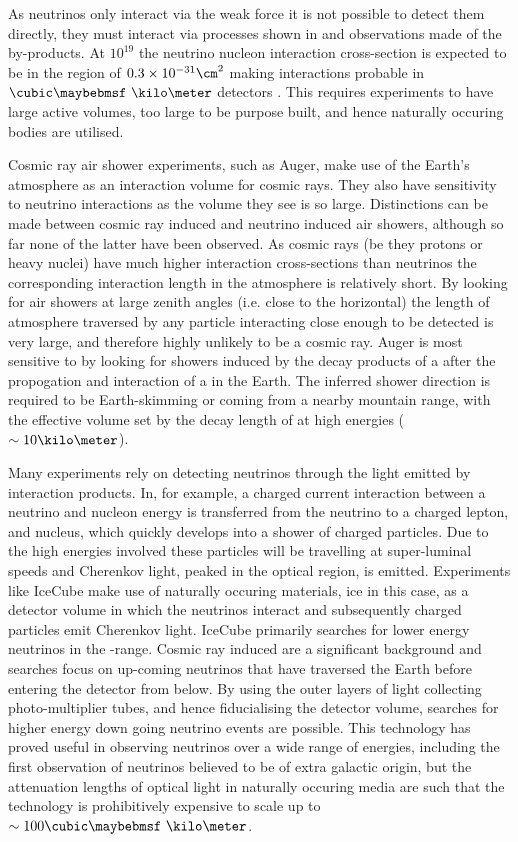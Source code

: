 As neutrinos only interact via the weak force it is not possible to detect them directly, they must interact via processes shown in  and observations made of the by-products. At $10^{19}$ \eV the neutrino nucleon interaction cross-section is expected to be in the region of $0.3 \times 10^{-31} \cm^{2}$ making interactions probable in $\cubic\km$ detectors \cite{Gandhi199681}. This requires experiments to have large active volumes, too large to be purpose built, and hence naturally occuring bodies are utilised.

Cosmic ray air shower experiments, such as Auger, make use of the Earth's atmosphere as an interaction volume for cosmic rays. They also have sensitivity to neutrino interactions as the volume they see is so large. Distinctions can be made between cosmic ray induced and neutrino induced air showers, although so far none of the latter have been observed. As cosmic rays (be they protons or heavy nuclei) have much higher interaction cross-sections than neutrinos the corresponding interaction length in the atmosphere is relatively short. By looking for air showers at large zenith angles (i.e. close to the horizontal) the length of atmosphere traversed by any particle interacting close enough to be detected is very large, and therefore highly unlikely to be a cosmic ray. Auger is most sensitive to \Pnut by looking for showers induced by the decay products of a \Ptau after the propogation and interaction of a \Pnut in the Earth. The inferred shower direction is required to be Earth-skimming or coming from a nearby mountain range, with the effective volume set by the decay length of \Ptau at high energies ($\sim 10 \kilo\meter$).


Many experiments rely on detecting neutrinos through the light emitted by interaction products. In, for example, a charged current interaction between a neutrino and nucleon energy is transferred from the neutrino to a charged lepton, and nucleus, which quickly develops into a shower of charged particles. Due to the high energies involved these particles will be travelling at super-luminal speeds and Cherenkov light, peaked in the optical region, is emitted. Experiments like IceCube make use of naturally occuring materials, ice in this case, as a detector volume in which the neutrinos interact and subsequently charged particles emit Cherenkov light. IceCube primarily searches for lower energy neutrinos in the \TeV-\PeV range. Cosmic ray induced \Pmu are a significant background and searches focus on up-coming neutrinos that have traversed the Earth before entering the detector from below. By using the outer layers of light collecting photo-multiplier tubes, and hence fiducialising the detector volume, searches for higher energy down going neutrino events are possible. This technology has proved useful in observing neutrinos over a wide range of energies, including the first observation of neutrinos believed to be of extra galactic origin, but the attenuation lengths of optical light in naturally occuring media are such that the technology is prohibitively expensive to scale up to $\sim 100 \cubic\km$.


